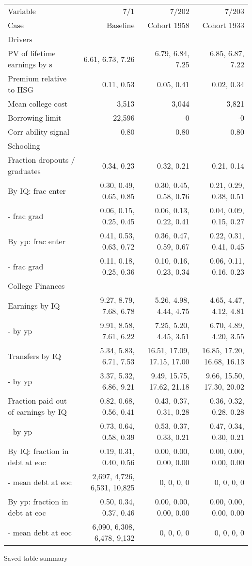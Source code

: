 \begin{tabular}{lrrr}
\hline
Variable & 7/1  & 7/202  & 7/203  \\ 
Case & Baseline  & Cohort 1958  & Cohort 1933  \\ 
Drivers &   &   &   \\ 
PV of lifetime earnings by s & 6.61, 6.73, 7.26  & 6.79, 6.84, 7.25  & 6.85, 6.87, 7.22  \\ 
Premium relative to HSG & 0.11, 0.53  & 0.05, 0.41  & 0.02, 0.34  \\ 
Mean college cost & 3,513  & 3,044  & 3,821  \\ 
Borrowing limit & -22,596  & -0  & -0  \\ 
Corr ability signal & 0.80  & 0.80  & 0.80  \\ 
\hline
Schooling &   &   &   \\ 
Fraction dropouts / graduates & 0.34, 0.23  & 0.32, 0.21  & 0.21, 0.14  \\ 
By IQ: frac enter & 0.30, 0.49, 0.65, 0.85  & 0.30, 0.45, 0.58, 0.76  & 0.21, 0.29, 0.38, 0.51  \\ 
- frac grad & 0.06, 0.15, 0.25, 0.45  & 0.06, 0.13, 0.22, 0.41  & 0.04, 0.09, 0.15, 0.27  \\ 
By yp: frac enter & 0.41, 0.53, 0.63, 0.72  & 0.36, 0.47, 0.59, 0.67  & 0.22, 0.31, 0.41, 0.45  \\ 
- frac grad & 0.11, 0.18, 0.25, 0.36  & 0.10, 0.16, 0.23, 0.34  & 0.06, 0.11, 0.16, 0.23  \\ 
\hline
College Finances &   &   &   \\ 
Earnings by IQ & 9.27, 8.79, 7.68, 6.78  & 5.26, 4.98, 4.44, 4.75  & 4.65, 4.47, 4.12, 4.81  \\ 
- by yp & 9.91, 8.58, 7.61, 6.22  & 7.25, 5.20, 4.45, 3.51  & 6.70, 4.89, 4.20, 3.55  \\ 
Transfers by IQ & 5.34, 5.83, 6.71, 7.53  & 16.51, 17.09, 17.15, 17.00  & 16.85, 17.20, 16.68, 16.13  \\ 
- by yp & 3.37, 5.32, 6.86, 9.21  & 9.49, 15.75, 17.62, 21.18  & 9.66, 15.50, 17.30, 20.02  \\ 
Fraction paid out of earnings by IQ & 0.82, 0.68, 0.56, 0.41  & 0.43, 0.37, 0.31, 0.28  & 0.36, 0.32, 0.28, 0.28  \\ 
- by yp & 0.73, 0.64, 0.58, 0.39  & 0.53, 0.37, 0.33, 0.21  & 0.47, 0.34, 0.30, 0.21  \\ 
By IQ: fraction in debt at eoc & 0.19, 0.31, 0.40, 0.56  & 0.00, 0.00, 0.00, 0.00  & 0.00, 0.00, 0.00, 0.00  \\ 
- mean debt at eoc & 2,697, 4,726, 6,531, 10,825  & 0, 0, 0, 0  & 0, 0, 0, 0  \\ 
By yp: fraction in debt at eoc & 0.50, 0.34, 0.37, 0.46  & 0.00, 0.00, 0.00, 0.00  & 0.00, 0.00, 0.00, 0.00  \\ 
- mean debt at eoc & 6,090, 6,308, 6,478, 9,132  & 0, 0, 0, 0  & 0, 0, 0, 0  \\ 
\hline
\end{tabular}%
Saved table summary

